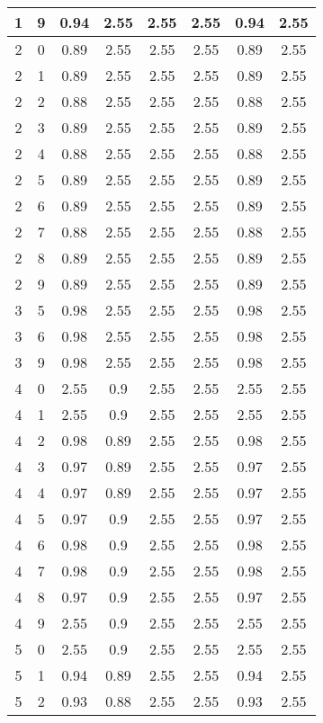 \begin{longtable}{|c|c||c||c|c|c||c|c|}
	1 & 9 & 0.94 & 2.55 & 2.55 & 2.55 & 0.94 & 2.55 \\ \hline
	2 & 0 & 0.89 & 2.55 & 2.55 & 2.55 & 0.89 & 2.55 \\ \hline
	2 & 1 & 0.89 & 2.55 & 2.55 & 2.55 & 0.89 & 2.55 \\ \hline
	2 & 2 & 0.88 & 2.55 & 2.55 & 2.55 & 0.88 & 2.55 \\ \hline
	2 & 3 & 0.89 & 2.55 & 2.55 & 2.55 & 0.89 & 2.55 \\ \hline
	2 & 4 & 0.88 & 2.55 & 2.55 & 2.55 & 0.88 & 2.55 \\ \hline
	2 & 5 & 0.89 & 2.55 & 2.55 & 2.55 & 0.89 & 2.55 \\ \hline
	2 & 6 & 0.89 & 2.55 & 2.55 & 2.55 & 0.89 & 2.55 \\ \hline
	2 & 7 & 0.88 & 2.55 & 2.55 & 2.55 & 0.88 & 2.55 \\ \hline
	2 & 8 & 0.89 & 2.55 & 2.55 & 2.55 & 0.89 & 2.55 \\ \hline
	2 & 9 & 0.89 & 2.55 & 2.55 & 2.55 & 0.89 & 2.55 \\ \hline
	3 & 5 & 0.98 & 2.55 & 2.55 & 2.55 & 0.98 & 2.55 \\ \hline
	3 & 6 & 0.98 & 2.55 & 2.55 & 2.55 & 0.98 & 2.55 \\ \hline
	3 & 9 & 0.98 & 2.55 & 2.55 & 2.55 & 0.98 & 2.55 \\ \hline
	4 & 0 & 2.55 & 0.9 & 2.55 & 2.55 & 2.55 & 2.55 \\ \hline
	4 & 1 & 2.55 & 0.9 & 2.55 & 2.55 & 2.55 & 2.55 \\ \hline
	4 & 2 & 0.98 & 0.89 & 2.55 & 2.55 & 0.98 & 2.55 \\ \hline
	4 & 3 & 0.97 & 0.89 & 2.55 & 2.55 & 0.97 & 2.55 \\ \hline
	4 & 4 & 0.97 & 0.89 & 2.55 & 2.55 & 0.97 & 2.55 \\ \hline
	4 & 5 & 0.97 & 0.9 & 2.55 & 2.55 & 0.97 & 2.55 \\ \hline
	4 & 6 & 0.98 & 0.9 & 2.55 & 2.55 & 0.98 & 2.55 \\ \hline
	4 & 7 & 0.98 & 0.9 & 2.55 & 2.55 & 0.98 & 2.55 \\ \hline
	4 & 8 & 0.97 & 0.9 & 2.55 & 2.55 & 0.97 & 2.55 \\ \hline
	4 & 9 & 2.55 & 0.9 & 2.55 & 2.55 & 2.55 & 2.55 \\ \hline
	5 & 0 & 2.55 & 0.9 & 2.55 & 2.55 & 2.55 & 2.55 \\ \hline
	5 & 1 & 0.94 & 0.89 & 2.55 & 2.55 & 0.94 & 2.55 \\ \hline
	5 & 2 & 0.93 & 0.88 & 2.55 & 2.55 & 0.93 & 2.55 \\ \hline

\end{longtable}

